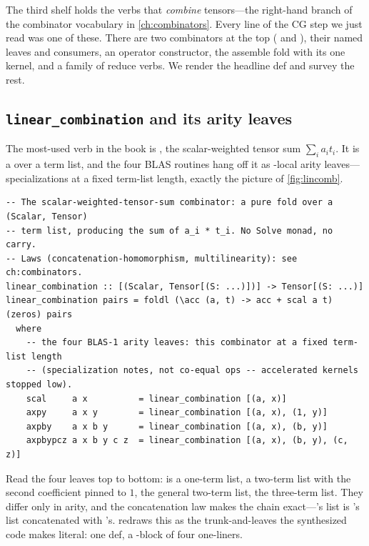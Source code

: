 The third shelf holds the verbs that \emph{combine} tensors---the right-hand branch
of the combinator vocabulary in \cref{ch:combinators}. Every line of the CG step we
just read was one of these. There are two combinators at the top
( and ), their named leaves and
consumers, an operator constructor, the assemble fold with its one 
kernel, and a family of reduce verbs. We render the headline def and survey the
rest.

\subsection{\texttt{linear\_combination} and its arity leaves}

The most-used verb in the book is , the scalar-weighted
tensor sum $\sum_i a_i t_i$. It is a  over a term list, and the four
BLAS routines hang off it as -local arity leaves---specializations at a
fixed term-list length, exactly the picture of \cref{fig:lincomb}.

\begin{lstlisting}[style=l4style]
-- The scalar-weighted-tensor-sum combinator: a pure fold over a (Scalar, Tensor)
-- term list, producing the sum of a_i * t_i. No Solve monad, no carry.
-- Laws (concatenation-homomorphism, multilinearity): see ch:combinators.
linear_combination :: [(Scalar, Tensor[(S: ...)])] -> Tensor[(S: ...)]
linear_combination pairs = foldl (\acc (a, t) -> acc + scal a t) (zeros) pairs
  where
    -- the four BLAS-1 arity leaves: this combinator at a fixed term-list length
    -- (specialization notes, not co-equal ops -- accelerated kernels stopped low).
    scal     a x          = linear_combination [(a, x)]
    axpy     a x y        = linear_combination [(a, x), (1, y)]
    axpby    a x b y      = linear_combination [(a, x), (b, y)]
    axpbypcz a x b y c z  = linear_combination [(a, x), (b, y), (c, z)]
\end{lstlisting}
Read the four leaves top to bottom:  is a one-term list,  a
two-term list with the second coefficient pinned to $1$,  the general
two-term list,  the three-term list. They differ only in arity, and
the concatenation law makes the chain exact---'s list is
's list concatenated with 's. 
redraws this as the trunk-and-leaves the synthesized code makes literal: one def, a
-block of four one-liners.

